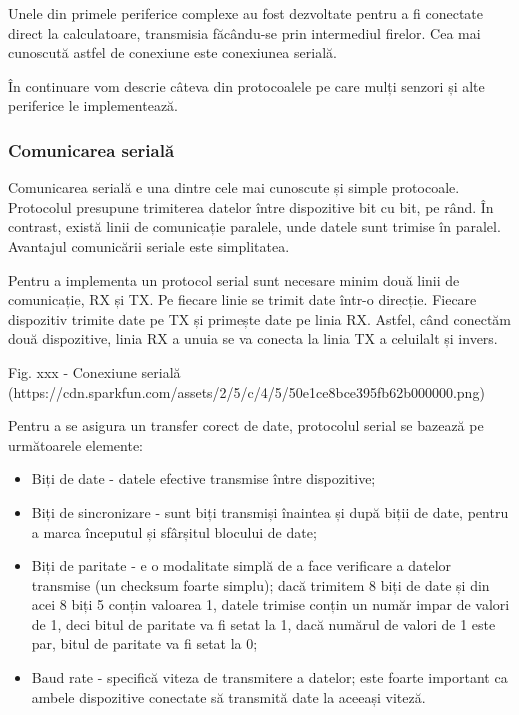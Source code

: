 Unele din primele periferice complexe au fost dezvoltate pentru a fi conectate
direct la calculatoare, transmisia făcându-se prin intermediul firelor. Cea mai
cunoscută astfel de conexiune este conexiunea serială.

În continuare vom descrie câteva din protocoalele pe care mulți senzori și alte
periferice le implementează.

\subsubsection{Comunicarea serială}
\label{sec:embed-bus-wire-serial}

Comunicarea serială e una dintre cele mai cunoscute și simple protocoale.
Protocolul presupune trimiterea datelor între dispozitive bit cu bit, pe rând.
În contrast, există linii de comunicație paralele, unde datele sunt trimise în
paralel. Avantajul comunicării seriale este simplitatea.

Pentru a implementa un protocol serial sunt necesare minim două linii de
comunicație, RX și TX. Pe fiecare linie se trimit date într-o direcție. Fiecare
dispozitiv trimite date pe TX și primește date pe linia RX. Astfel, când
conectăm două dispozitive, linia RX a unuia se va conecta la linia TX a
celuilalt și invers.

Fig. xxx - Conexiune serială
(https://cdn.sparkfun.com/assets/2/5/c/4/5/50e1ce8bce395fb62b000000.png)

Pentru a se asigura un transfer corect de date, protocolul serial se bazează pe
următoarele elemente:

\begin{itemize}
	\item Biți de date - datele efective transmise între dispozitive;
	\item Biți de sincronizare - sunt biți transmiși înaintea și după biții
		de date, pentru a marca începutul și sfârșitul blocului de date;
	\item Biți de paritate - e o modalitate simplă de a face verificare a
		datelor transmise (un checksum foarte simplu); dacă trimitem 8
		biți de date și din acei 8 biți 5 conțin valoarea 1, datele
		trimise conțin un număr impar de valori de 1, deci bitul de
		paritate va fi setat la 1, dacă numărul de valori de 1 este par,
		bitul de paritate va fi setat la 0;
	\item Baud rate - specifică viteza de transmitere a datelor; este foarte
		important ca ambele dispozitive conectate să transmită date la
		aceeași viteză.
\end{itemize}

